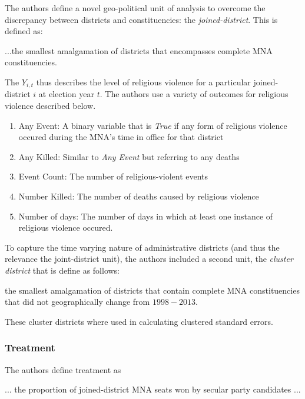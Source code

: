 \documentclass{scrartcl}
\begin{document}
The authors define a novel geo-political unit of analysis to overcome the discrepancy between districts and constituencies: the \textit{joined-district}. 
This is defined as:
\begin{displayquote}
...the smallest amalgamation of districts that encompasses complete MNA constituencies. 
\end{displayquote}

The $Y_{i,t}$ thus describes the level of religious violence for a particular joined-district $i$ at election year $t$. The authors use a variety of outcomes for religious violence described below. 

\begin{enumerate}
\item Any Event: A binary variable that is \textit{True} if any form of religious violence occured during the MNA's time in office for that district
\item Any Killed: Similar to \textit{Any Event} but referring to any deaths
\item Event Count: The number of religious-violent events
\item Number Killed: The number of deaths caused by religious violence
\item Number of days: The number of days in which at least one instance of religious violence occured.
\end{enumerate}

To capture the time varying nature of administrative districts (and thus the relevance the joint-district unit), the authors included a second unit, the \textit{cluster district} that is define as follows:

\begin{displayquote}
  the smallest amalgamation of districts that contain complete MNA constituencies that did not geographically change from $1998 - 2013$.
\end{displayquote}

These cluster districts where used in calculating clustered standard errors.

\subsubsection{Treatment}

The authors define treatment as

\begin{displayquote}
... the proportion of joined-district MNA seats
  won by secular party candidates ...
\end{displayquote}
\end{document}
